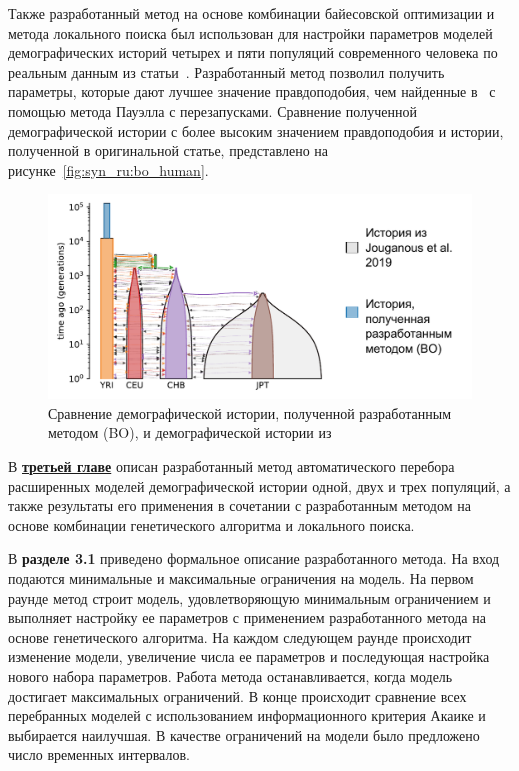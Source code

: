 Также разработанный метод на основе комбинации байесовской оптимизации и метода локального поиска был использован для настройки параметров моделей демографических историй четырех и пяти популяций современного человека по реальным данным из статьи~\cite{jouganous2017inferring}.
Разработанный метод позволил получить параметры, которые дают лучшее значение правдоподобия, чем найденные в~\cite{jouganous2017inferring} с помощью метода Пауэлла с перезапусками.
Сравнение полученной демографической истории с более высоким значением правдоподобия и истории, полученной в оригинальной статье, представлено на рисунке~\ref{fig:syn_ru:bo_human}.
\begin{figure}[h!]
    \centering
    \includegraphics[width=0.8\linewidth]{images_experiments/bo_human/4pops_base.pdf}
    \caption{Сравнение демографической истории, полученной разработанным методом (BO), и демографической истории из~\cite{jouganous2017inferring}}
\end{figure}


В \underline{\textbf{третьей главе}} описан разработанный метод автоматического перебора расширенных моделей демографической истории одной, двух и трех популяций, а также результаты его применения в сочетании с разработанным методом на основе комбинации генетического алгоритма и локального поиска.

В \textbf{разделе 3.1} приведено формальное описание разработанного метода.
На вход подаются минимальные и максимальные ограничения на модель.
На первом раунде метод строит модель, удовлетворяющую минимальным ограничением и выполняет настройку ее параметров с применением разработанного метода на основе генетического алгоритма.
На каждом следующем раунде происходит изменение модели, увеличение числа ее параметров и последующая настройка нового набора параметров.
Работа метода останавливается, когда модель достигает максимальных ограничений.
В конце происходит сравнение всех перебранных моделей с использованием информационного критерия Акаике и выбирается наилучшая.
В качестве ограничений на модели было предложено число временных интервалов.

